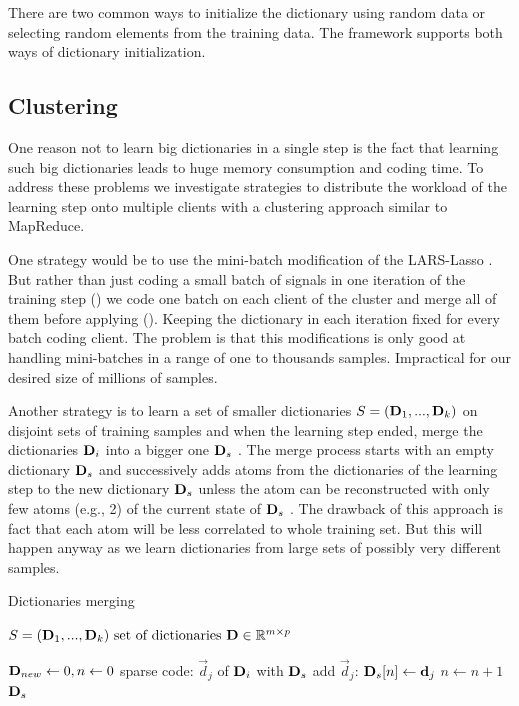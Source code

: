 There are two common ways to initialize the dictionary using random data or
selecting random elements from the training data. The framework supports 
both ways of dictionary initialization. 


\subsection{Clustering}
\label{sec:clustering}
One reason not to learn big dictionaries in a single step is the fact that
learning such big dictionaries leads to huge memory consumption and coding time.
To address these problems we investigate strategies to distribute the workload
of the learning step onto multiple clients with a clustering approach similar to
MapReduce. 

One strategy would be to use the mini-batch
modification of the LARS-Lasso . But rather
than just coding a small batch of signals in one iteration of the training
step () we code one batch on each client of the cluster
and merge all of them before applying (). Keeping the
dictionary in each iteration fixed for every batch coding client. The problem is
that this modifications is only good at handling mini-batches in a range of one
to thousands samples. Impractical for our desired size of millions of samples.

Another strategy is to learn a set of smaller dictionaries $S =
(\boldsymbol{\mathrm{D}}_1, ..., \boldsymbol{\mathrm{D}}_k)$ on disjoint sets of training samples and when
the learning step ended, merge the dictionaries $\boldsymbol{\mathrm{D}}_i$ into a bigger one
$\boldsymbol{\mathrm{D}}_{s}$ . The merge process starts with an empty dictionary
$\boldsymbol{\mathrm{D}}_{s}$  and successively adds atoms from the dictionaries of the
learning step to the new dictionary $\boldsymbol{\mathrm{D}}_{s}$  unless the atom can be
reconstructed with only few atoms (e.g., 2) of the current state of
$\boldsymbol{\mathrm{D}}_{s}$ . The drawback of this approach is fact that 
each atom will be less correlated to whole training set. But this will happen
anyway as we learn dictionaries from large sets of possibly very different
samples. 

\begin{algorithm}[H]
\caption{Dictionaries merging}
\label{alg:merging}
\begin{algorithmic}[1]
\REQUIRE $ S = (\boldsymbol{\mathrm{D}}_1, ..., \boldsymbol{\mathrm{D}}_k) \text{ set of dictionaries } \boldsymbol{\mathrm{D}}
\in \mathbb{R}^{m\times p}$

\STATE $\boldsymbol{\mathrm{D}}_{new} \gets 0, n \gets 0$
\STATE sparse code: $\vec{d}_j$ of $\boldsymbol{\mathrm{D}}_i$ with $\boldsymbol{\mathrm{D}}_{s}$
\STATE add $\vec{d}_j$: $\boldsymbol{\mathrm{D}}_{s}[n] \gets \boldsymbol{\mathrm{d}}_{j}$
\STATE $n \gets n+1$
\ENDIF
\ENDFOR
\ENDFOR
\RETURN $\boldsymbol{\mathrm{D}}_s$
\end{algorithmic}
\end{algorithm}



